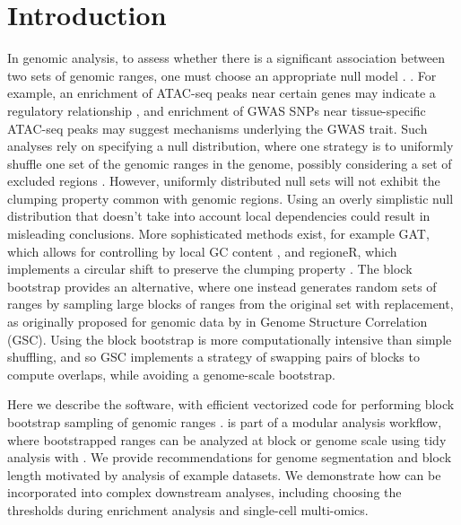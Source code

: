 \section{Introduction}

In genomic analysis, to assess whether
there is a significant association between two sets of genomic ranges, 
one must choose an appropriate null model \citep{reviewdilemma2014,kanduri2018}.
.
For example, an enrichment of ATAC-seq peaks near certain genes
may indicate a regulatory relationship \citep{lee2020fluent}, 
and enrichment of GWAS SNPs near tissue-specific ATAC-seq peaks may
suggest mechanisms underlying the GWAS trait.
Such analyses rely on specifying a null distribution, where one
strategy is to uniformly shuffle one set of the
genomic ranges in the genome, possibly considering a set of
excluded regions  \citep{excluderanges}.
However, uniformly distributed null sets will not exhibit the
clumping property common with genomic regions.
Using an overly simplistic null distribution that doesn't take into
account local dependencies could result in misleading conclusions.
More sophisticated methods exist, for example
GAT, which allows for controlling by local GC content
\citep{GAT_2013}, and regioneR, which implements a circular shift to
preserve the clumping property \citep{gel2016regioner}.
The block bootstrap \citep{politis1999subsampling}
provides an alternative, where one instead generates
random sets of ranges by sampling large blocks of ranges from the
original set with replacement, as originally proposed for 
genomic data by \citet{bickel2010subsampling} in Genome Structure
Correlation (GSC).
Using the block bootstrap is more
computationally intensive than simple shuffling, and so GSC implements
a strategy of swapping pairs of blocks to compute overlaps, while
avoiding a genome-scale bootstrap.

Here we describe the \bootranges software, with efficient
vectorized code for performing block bootstrap sampling of genomic ranges
\citep{lawrence2013software}.
\bootranges is part of a modular analysis workflow, where bootstrapped
ranges can be analyzed at block or genome scale using tidy
analysis with \plyranges \citep{lee2019plyranges}.
We provide recommendations for genome segmentation and block length
motivated by analysis of example datasets.
We demonstrate how \bootranges can be incorporated into complex
downstream analyses, including choosing the thresholds during
enrichment analysis and single-cell multi-omics.

